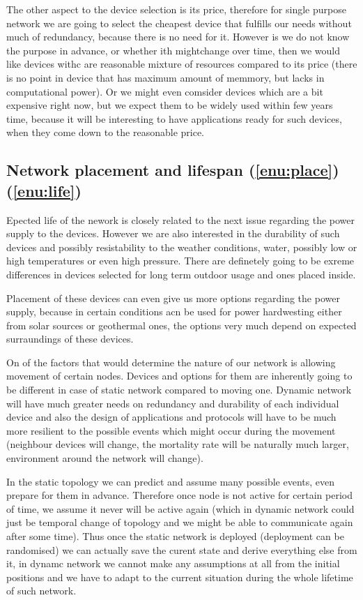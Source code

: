 \documentclass[
  digital, %
  table,   %
  nolof,     %
  nolot,     %
           oneside
]{fithesis3}
\begin{document}
  The other aspect to the device selection is its price, therefore for single purpose network we are going to select the cheapest device that fulfills our needs without much of redundancy, because there is no need for it. However is we do not know the purpose in advance, or whether ith mightchange over time, then we would like devices withc are reasonable mixture of resources compared to its price (there is no point in device that has maximum amount of memmory, but lacks in computational power). Or we might even comsider devices which are a bit expensive right now, but we expect them to be widely used within few years time, because it will be interesting to have applications ready for such devices, when they come down to the reasonable price.

  \subsection{Network placement and lifespan (\ref{enu:place}) (\ref{enu:life})}
  Epected life of the nework is closely related to the next issue regarding the power supply to the devices. However we are also interested in the durability of such devices and possibly resistability to the weather conditions, water, possibly low or high temperatures or even high pressure. There are definetely going to be exreme differences in devices selected for long term outdoor usage and ones placed inside.

  Placement of these devices can even give us more options regarding the power supply, because in certain conditions acn be used for power hardwesting either from solar sources or geothermal ones, the options very much depend on expected surraundings of these devices.

  On of the factors that would determine the nature of our network is allowing movement of certain nodes. Devices and options for them are inherently going to be different in case of static network compared to moving one. Dynamic network will have much greater needs on redundancy and durability of each individual device and also the design of applications and protocols will have to be much more resilient to the possible events which might occur during the movement (neighbour devices will change, the mortality rate will be naturally much larger, environment around the network will change).

  In the static topology we can predict and assume many possible events, even prepare for them in advance. Therefore once node is not active for certain period of time, we assume it never will be active again (which in dynamic network could just be temporal change of topology and we might be able to communicate again after some time). Thus once the static network is deployed (deployment can be randomised) we can actually save the curent state and derive everything else from it, in dynamc network we cannot make any assumptions at all from the initial positions and we have to adapt to the current situation during the whole lifetime of such network.
\end{document}
